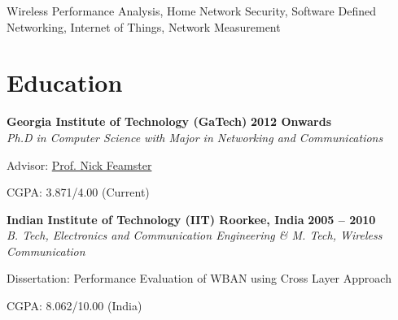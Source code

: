\documentclass[margin,line]{resume}
\begin{document}
\begin{resume}
    Wireless Performance Analysis, Home Network Security, Software Defined Networking, Internet of Things, Network Measurement

    \section{\mysidestyle \normalsize Education}

    \textbf{Georgia Institute of Technology (GaTech)}  		\hfill \textbf{2012  Onwards} \\%
    \emph {Ph.D in Computer Science with Major in Networking and Communications}			 \\\vspace{-4mm}
    \begin{list2}
      \item Advisor: \href{http://www.cc.gatech.edu/~feamster/}{Prof. Nick Feamster}
      \item CGPA: 3.871/4.00 (Current)
    \end{list2}
    
    \textbf{Indian Institute of Technology (IIT) Roorkee, India}  		\hfill \textbf{2005 -- 2010} \\%
    \emph {B. Tech, Electronics and Communication Engineering \& M. Tech, Wireless Communication}			 \\\vspace{-4mm}
    \begin{list2}
      \item Dissertation: Performance Evaluation of WBAN using Cross Layer Approach
      \item CGPA: 8.062/10.00 (India)
    \end{list2}


\end{resume}
\end{document}
